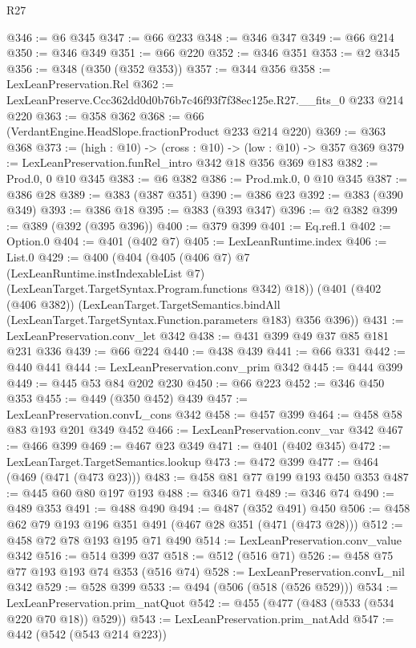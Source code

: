 \begin{lexlean}{R27}
\begin{coremodule}
@346 := @6 @345
@347 := @66 @233
@348 := @346 @347
@349 := @66 @214
@350 := @346 @349
@351 := @66 @220
@352 := @346 @351
@353 := @2 @345
@356 := @348 (@350 (@352 @353))
@357 := @344 @356
@358 := LexLeanPreservation.Rel
@362 := LexLeanPreserve.Ccc362dd0d0b76b7c46f93f7f38ec125e.R27.__fits_0 @233 @214 @220
@363 := @358 @362
@368 := @66 (VerdantEngine.HeadSlope.fractionProduct @233 @214 @220)
@369 := @363 @368
@373 := (high : @10) -> (cross : @10) -> (low : @10) -> @357 @369
@379 := LexLeanPreservation.funRel_intro @342 @18 @356 @369 @183
@382 := Prod.{0, 0} @10 @345
@383 := @6 @382
@386 := Prod.mk.{0, 0} @10 @345
@387 := @386 @28
@389 := @383 (@387 @351)
@390 := @386 @23
@392 := @383 (@390 @349)
@393 := @386 @18
@395 := @383 (@393 @347)
@396 := @2 @382
@399 := @389 (@392 (@395 @396))
@400 := @379 @399
@401 := Eq.refl.{1}
@402 := Option.{0}
@404 := @401 (@402 @7)
@405 := LexLeanRuntime.index
@406 := List.{0}
@429 := @400
    (@404
      (@405
        (@406 @7)
        @7
        (LexLeanRuntime.instIndexableList @7)
        (LexLeanTarget.TargetSyntax.Program.functions @342)
        @18))
    (@401
      (@402 (@406 @382))
      (LexLeanTarget.TargetSemantics.bindAll
        (LexLeanTarget.TargetSyntax.Function.parameters @183)
        @356
        @396))
@431 := LexLeanPreservation.conv_let @342
@438 := @431 @399 @49 @37 @85 @181 @231 @336
@439 := @66 @224
@440 := @438 @439
@441 := @66 @331
@442 := @440 @441
@444 := LexLeanPreservation.conv_prim @342
@445 := @444 @399
@449 := @445 @53 @84 @202 @230
@450 := @66 @223
@452 := @346 @450 @353
@455 := @449 (@350 @452) @439
@457 := LexLeanPreservation.convL_cons @342
@458 := @457 @399
@464 := @458 @58 @83 @193 @201 @349 @452
@466 := LexLeanPreservation.conv_var @342
@467 := @466 @399
@469 := @467 @23 @349
@471 := @401 (@402 @345)
@472 := LexLeanTarget.TargetSemantics.lookup
@473 := @472 @399
@477 := @464 (@469 (@471 (@473 @23)))
@483 := @458 @81 @77 @199 @193 @450 @353
@487 := @445 @60 @80 @197 @193
@488 := @346 @71
@489 := @346 @74
@490 := @489 @353
@491 := @488 @490
@494 := @487 (@352 @491) @450
@506 := @458 @62 @79 @193 @196 @351 @491 (@467 @28 @351 (@471 (@473 @28)))
@512 := @458 @72 @78 @193 @195 @71 @490
@514 := LexLeanPreservation.conv_value @342
@516 := @514 @399 @37
@518 := @512 (@516 @71)
@526 := @458 @75 @77 @193 @193 @74 @353 (@516 @74)
@528 := LexLeanPreservation.convL_nil @342
@529 := @528 @399
@533 := @494 (@506 (@518 (@526 @529)))
@534 := LexLeanPreservation.prim_natQuot
@542 := @455 (@477 (@483 (@533 (@534 @220 @70 @18)) @529))
@543 := LexLeanPreservation.prim_natAdd
@547 := @442 (@542 (@543 @214 @223))

\end{coremodule}
\end{lexlean}
